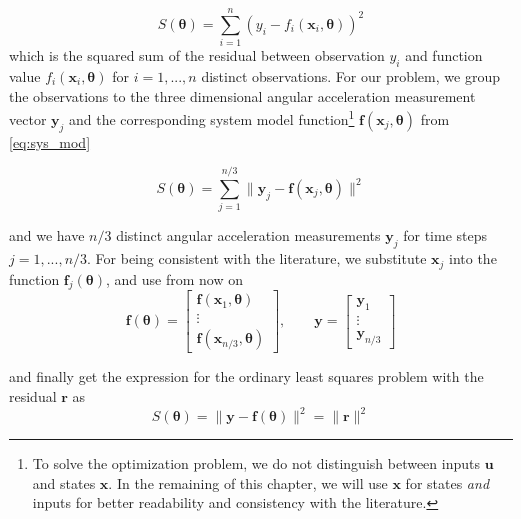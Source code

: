 \begin{equation}
S(\boldsymbol{\theta}) = \sum_{i=1}^n ( y_i - f_i(\mathbf{x}_i, \boldsymbol{\theta}) )^2
\end{equation}
which is the squared sum of the residual between observation
$y_i$
and function value
$f_i(\mathbf{x}_i, \boldsymbol{\theta})$
for
$i=1,...,n$ distinct observations.
For our problem, we group the observations to the three dimensional angular acceleration measurement vector $\mathbf{y}_j$ and the corresponding system model function\footnote{
To solve the optimization problem, we do not distinguish between inputs $\mathbf{u}$ and states $\mathbf{x}$.
In the remaining of this chapter, we will use $\mathbf{x}$ for states \textit{and} inputs for better readability and consistency with the literature.}
$\mathbf{f}(\mathbf{x}_j, \boldsymbol{\theta})$ from \cref{eq:sys_mod}

\begin{equation}
\label{eq:cost_f_x_theta}
S(\boldsymbol{\theta}) = \sum_{j=1}^{n/3} \| \mathbf{y}_j - \mathbf{f}(\mathbf{x}_j, \boldsymbol{\theta}) \|^2
\end{equation}

and we have $n/3$ distinct angular acceleration measurements $\mathbf{y}_j$ for time steps $j=1,...,n/3$.
For being consistent with the literature, we substitute $\mathbf{x}_j$ into the function $\mathbf{f}_j(\boldsymbol{\theta})$, and use from now on
\begin{equation}
\mathbf{f}(\boldsymbol{\theta}) = \left[ \begin{array}{c}
\mathbf{f}(\mathbf{x}_1, \boldsymbol{\theta}) \\
\vdots \\
\mathbf{f}(\mathbf{x}_{n/3}, \boldsymbol{\theta})
\end{array} \right]
, \qquad
\mathbf{y} = \left[ \begin{array}{c}
\mathbf{y}_1 \\
\vdots \\
\mathbf{y}_{n/3} 
\end{array} \right]
\end{equation}

and finally get the expression for the ordinary least squares problem with the residual $\mathbf{r}$ as
\begin{equation}
\label{eq:cost_ols}
S(\boldsymbol{\theta}) = \| \mathbf{y} - \mathbf{f}(\boldsymbol{\theta}) \|^2 = \| \mathbf{r} \|^2
\end{equation}

